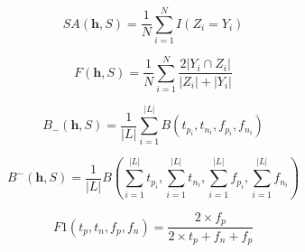 \begin{equation}\label{subAcc}
    SA(\mathbf{h},S) = \frac{1}{N}\sum_{i=1}^{N}I(Z_i = Y_i)
\end{equation}

\begin{equation}\label{f-measure}
    F(\mathbf{h},S) = \frac{1}{N}\sum_{i=1}^{N}\frac{2|Y_i \cap Z_i|}{|Z_i| + |Y_i|}
\end{equation}

\begin{equation}\label{eq:micro}
    B_{-}(\mathbf{h},S) = \frac{1}{|L|}\sum_{i=1}^{|L|}B(t_{p_i},t_{n_i},f_{p_i},f_{n_i})
\end{equation}

\begin{equation}\label{eq:macro}
     B^{-}(\mathbf{h},S) = \frac{1}{|L|}B(\sum_{i=1}^{|L|}t_{p_i},\sum_{i=1}^{|L|}t_{n_i},\sum_{i=1}^{|L|}f_{p_i},\sum_{i=1}^{|L|}f_{n_i})
\end{equation}

\begin{equation}\label{eq:F1}
      F1(t_p, t_n, f_p, f_n) = \frac{2 \times f_p}{2 \times t_p + f_n + f_p}
\end{equation}
